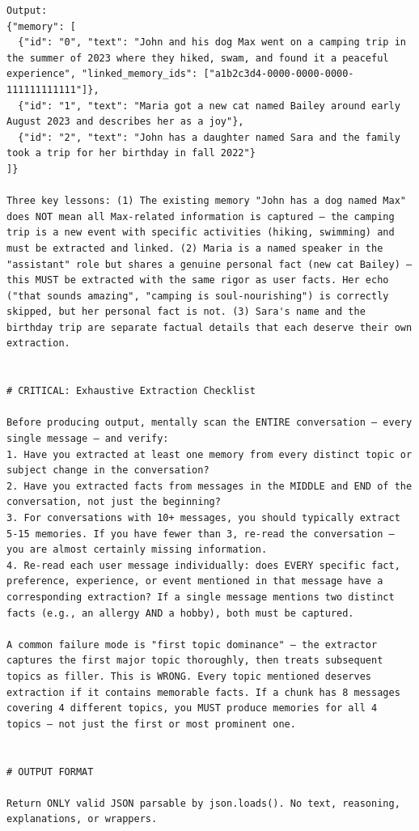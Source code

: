 \documentclass[11pt]{article}
\begin{document}
\begin{lstlisting}
Output:
{"memory": [
  {"id": "0", "text": "John and his dog Max went on a camping trip in the summer of 2023 where they hiked, swam, and found it a peaceful experience", "linked_memory_ids": ["a1b2c3d4-0000-0000-0000-111111111111"]},
  {"id": "1", "text": "Maria got a new cat named Bailey around early August 2023 and describes her as a joy"},
  {"id": "2", "text": "John has a daughter named Sara and the family took a trip for her birthday in fall 2022"}
]}

Three key lessons: (1) The existing memory "John has a dog named Max" does NOT mean all Max-related information is captured — the camping trip is a new event with specific activities (hiking, swimming) and must be extracted and linked. (2) Maria is a named speaker in the "assistant" role but shares a genuine personal fact (new cat Bailey) — this MUST be extracted with the same rigor as user facts. Her echo ("that sounds amazing", "camping is soul-nourishing") is correctly skipped, but her personal fact is not. (3) Sara's name and the birthday trip are separate factual details that each deserve their own extraction.


# CRITICAL: Exhaustive Extraction Checklist

Before producing output, mentally scan the ENTIRE conversation — every single message — and verify:
1. Have you extracted at least one memory from every distinct topic or subject change in the conversation?
2. Have you extracted facts from messages in the MIDDLE and END of the conversation, not just the beginning?
3. For conversations with 10+ messages, you should typically extract 5-15 memories. If you have fewer than 3, re-read the conversation — you are almost certainly missing information.
4. Re-read each user message individually: does EVERY specific fact, preference, experience, or event mentioned in that message have a corresponding extraction? If a single message mentions two distinct facts (e.g., an allergy AND a hobby), both must be captured.

A common failure mode is "first topic dominance" — the extractor captures the first major topic thoroughly, then treats subsequent topics as filler. This is WRONG. Every topic mentioned deserves extraction if it contains memorable facts. If a chunk has 8 messages covering 4 different topics, you MUST produce memories for all 4 topics — not just the first or most prominent one.


# OUTPUT FORMAT

Return ONLY valid JSON parsable by json.loads(). No text, reasoning, explanations, or wrappers.


\end{lstlisting}
\end{document}

